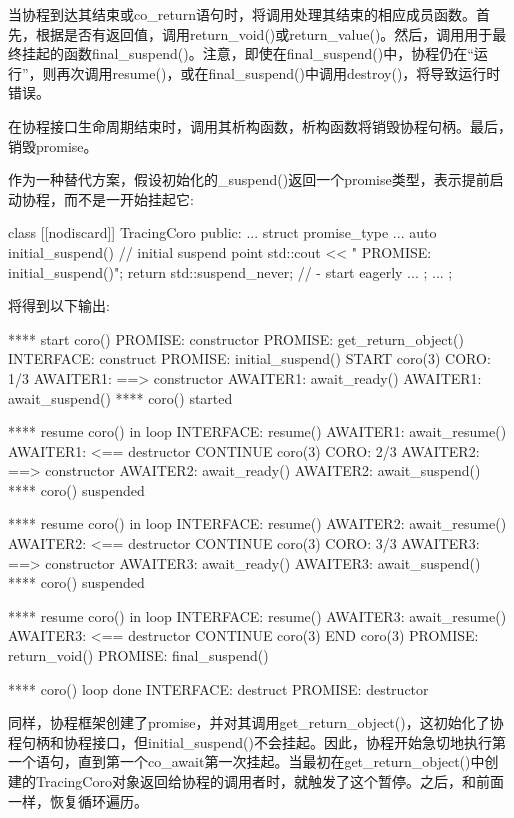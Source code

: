 当协程到达其结束或co\_return语句时，将调用处理其结束的相应成员函数。首先，根据是否有返回值，调用return\_void()或return\_value()。然后，调用用于最终挂起的函数final\_suspend()。注意，即使在final\_suspend()中，协程仍在“运行”，则再次调用resume()，或在final\_suspend()中调用destroy()，将导致运行时错误。

在协程接口生命周期结束时，调用其析构函数，析构函数将销毁协程句柄。最后，销毁promise。

作为一种替代方案，假设初始化的\_suspend()返回一个promise类型，表示提前启动协程，而不是一开始挂起它:

\begin{cpp}
class [[nodiscard]] TracingCoro {
	public:
	...
	struct promise_type {
		...
		auto initial_suspend() { // initial suspend point
			std::cout << " PROMISE: initial_suspend()\n";
			return std::suspend_never{}; // - start eagerly
		}
		...
	};
	...
};
\end{cpp}

将得到以下输出:

\begin{shell}
**** start coro()
      PROMISE: constructor
      PROMISE: get_return_object()
        INTERFACE: construct
      PROMISE: initial_suspend()
  START coro(3)
  CORO: 1/3
          AWAITER1: ==> constructor
          AWAITER1: await_ready()
          AWAITER1: await_suspend()
**** coro() started

**** resume coro() in loop
        INTERFACE: resume()
          AWAITER1: await_resume()
          AWAITER1: <== destructor
  CONTINUE coro(3)
  CORO: 2/3
          AWAITER2: ==> constructor
          AWAITER2: await_ready()
          AWAITER2: await_suspend()
**** coro() suspended

**** resume coro() in loop
        INTERFACE: resume()
          AWAITER2: await_resume()
          AWAITER2: <== destructor
  CONTINUE coro(3)
  CORO: 3/3
          AWAITER3: ==> constructor
          AWAITER3: await_ready()
          AWAITER3: await_suspend()
**** coro() suspended

**** resume coro() in loop
        INTERFACE: resume()
          AWAITER3: await_resume()
          AWAITER3: <== destructor
  CONTINUE coro(3)
  END coro(3)
      PROMISE: return_void()
      PROMISE: final_suspend()
      
**** coro() loop done
        INTERFACE: destruct
      PROMISE: destructor
\end{shell}

同样，协程框架创建了promise，并对其调用get\_return\_object()，这初始化了协程句柄和协程接口，但initial\_suspend()不会挂起。因此，协程开始急切地执行第一个语句，直到第一个co\_await第一次挂起。当最初在get\_return\_object()中创建的TracingCoro对象返回给协程的调用者时，就触发了这个暂停。之后，和前面一样，恢复循环遍历。









